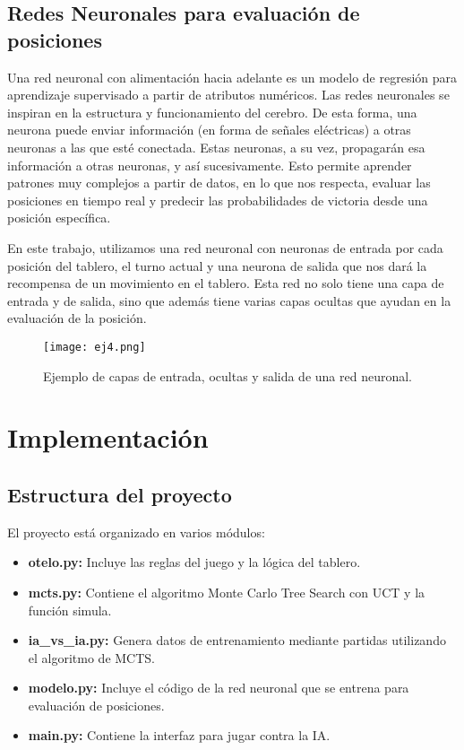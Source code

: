 \documentclass[conference]{IEEEtran}
\begin{document}
\subsection{Redes Neuronales para evaluación de posiciones}
Una red neuronal con alimentación hacia adelante es un modelo de regresión para aprendizaje supervisado a partir de atributos numéricos. Las redes neuronales se inspiran en la estructura y funcionamiento del cerebro. De esta forma, una neurona puede enviar información (en forma de señales eléctricas) a otras neuronas a las que esté conectada. Estas neuronas, a su vez, propagarán esa información a otras neuronas, y así sucesivamente. Esto permite aprender patrones muy complejos a partir de datos, en lo que nos respecta, evaluar las posiciones en tiempo real y predecir las probabilidades de victoria desde una posición específica.

En este trabajo, utilizamos una red neuronal con neuronas de entrada por cada posición del tablero, el turno actual y una neurona de salida que nos dará la recompensa de un movimiento en el tablero. Esta red no solo tiene una capa de entrada y de salida, sino que además tiene varias capas ocultas que ayudan en la evaluación de la posición.

\begin{figure}[htbp]
    \centerline{\texttt{[image: ej4.png]}}
    \caption{Ejemplo de capas de entrada, ocultas y salida de una red neuronal.}
\end{figure}

\section{Implementación}
\subsection{Estructura del proyecto}
El proyecto está organizado en varios módulos:
\begin{itemize}
    \item \textbf{otelo.py:} Incluye las reglas del juego y la lógica del tablero.
    \item \textbf{mcts.py:} Contiene el algoritmo Monte Carlo Tree Search con UCT y la función simula.
    \item \textbf{ia\_vs\_ia.py:} Genera datos de entrenamiento mediante partidas utilizando el algoritmo de MCTS.
    \item \textbf{modelo.py:} Incluye el código de la red neuronal que se entrena para evaluación de posiciones.
    \item \textbf{main.py:} Contiene la interfaz para jugar contra la IA.
\end{itemize}
\end{document}
